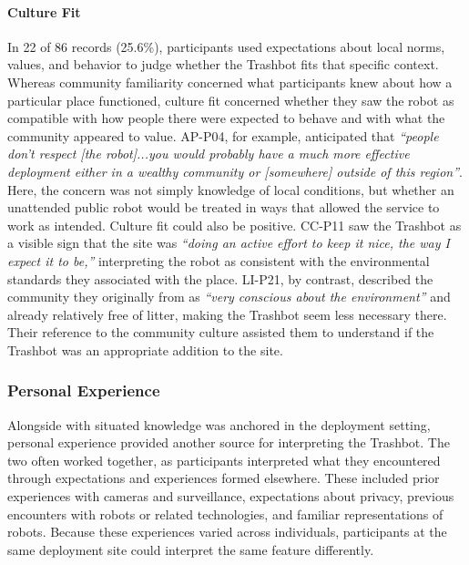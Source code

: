 
\paragraph{Culture Fit}
In 22 of 86 records (25.6\%), participants used expectations about local norms, values, and behavior to judge whether the Trashbot fits that specific context. Whereas community familiarity concerned what participants knew about how a particular place functioned, culture fit concerned whether they saw the robot as compatible with how people there were expected to behave and with what the community appeared to value. AP-P04, for example, anticipated that \emph{``people don't respect [the robot]...you would probably have a much more effective deployment either in a wealthy community or [somewhere] outside of this region''}. Here, the concern was not simply knowledge of local conditions, but whether an unattended public robot would be treated in ways that allowed the service to work as intended. Culture fit could also be positive. CC-P11 saw the Trashbot as a visible sign that the site was \emph{``doing an active effort to keep it nice, the way I expect it to be,''} interpreting the robot as consistent with the environmental standards they associated with the place. LI-P21, by contrast, described the community they originally from as \emph{``very conscious about the environment''} and already relatively free of litter, making the Trashbot seem less necessary there. Their reference to the community culture assisted them to understand if the Trashbot was an appropriate addition to the site.

\subsubsection{Personal Experience}
Alongside with situated knowledge was anchored in the deployment setting, personal experience provided another source for interpreting the Trashbot. The two often worked together, as participants interpreted what they encountered through expectations and experiences formed elsewhere. These included prior experiences with cameras and surveillance, expectations about privacy, previous encounters with robots or related technologies, and familiar representations of robots. Because these experiences varied across individuals, participants at the same deployment site could interpret the same feature differently.

